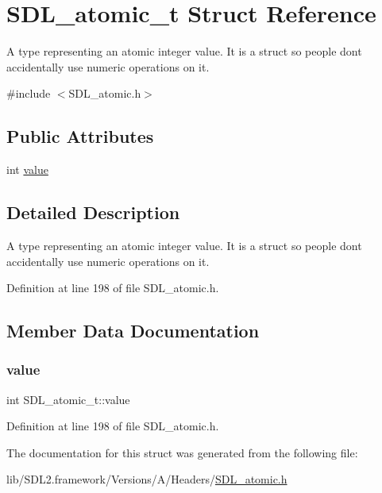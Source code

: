 \hypertarget{struct_s_d_l__atomic__t}{}\section{S\+D\+L\+\_\+atomic\+\_\+t Struct Reference}
\label{struct_s_d_l__atomic__t}


A type representing an atomic integer value. It is a struct so people don\textquotesingle{}t accidentally use numeric operations on it.  




{\ttfamily \#include $<$S\+D\+L\+\_\+atomic.\+h$>$}

\subsection*{Public Attributes}
\begin{DoxyCompactItemize}
\item 
int \mbox{\hyperlink{struct_s_d_l__atomic__t_a0d09ddf3cc5798c709edb7cea104203a}{value}}
\end{DoxyCompactItemize}


\subsection{Detailed Description}
A type representing an atomic integer value. It is a struct so people don\textquotesingle{}t accidentally use numeric operations on it. 

Definition at line 198 of file S\+D\+L\+\_\+atomic.\+h.



\subsection{Member Data Documentation}
\mbox{\label{struct_s_d_l__atomic__t_a0d09ddf3cc5798c709edb7cea104203a}} 
\subsubsection{\texorpdfstring{value}{value}}
{\footnotesize\ttfamily int S\+D\+L\+\_\+atomic\+\_\+t\+::value}



Definition at line 198 of file S\+D\+L\+\_\+atomic.\+h.



The documentation for this struct was generated from the following file\+:\begin{DoxyCompactItemize}
\item 
lib/\+S\+D\+L2.\+framework/\+Versions/\+A/\+Headers/\mbox{\hyperlink{_s_d_l__atomic_8h}{S\+D\+L\+\_\+atomic.\+h}}\end{DoxyCompactItemize}
